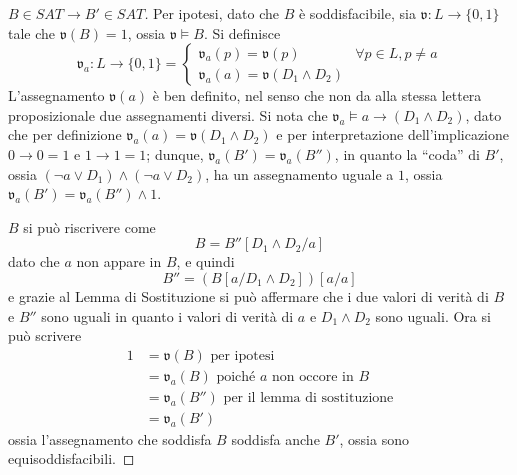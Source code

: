 \begin{proof}[$B \in SAT \rightarrow B' \in SAT$]
        Per ipotesi, dato che $B$ è soddisfacibile, sia $\mathfrak{v}:L \rightarrow \{0,1\}$
        tale che $\mathfrak{v}(B) = 1$, ossia $\mathfrak{v} \models B$. 
        Si definisce 
        $$
        \mathfrak{v}_a: L \rightarrow \{0,1\} = 
        \begin{cases}
                \mathfrak{v}_a(p) = \mathfrak{v}(p) & \forall p \in L, p \neq a \\
                \mathfrak{v}_a(a) = \mathfrak{v}(D_1 \land D_2) 
        \end{cases} 
        $$
        L'assegnamento $\mathfrak{v}(a)$ è ben definito, nel senso che non 
        da alla stessa lettera proposizionale due assegnamenti diversi.
        Si nota che $\mathfrak{v}_a \models a \rightarrow (D_1 \land D_2)$, 
        dato che per definizione $\mathfrak{v}_a(a) = \mathfrak{v}(D_1 \land D_2)$
        e per interpretazione dell'implicazione $0 \rightarrow 0 = 1$ e 
        $1 \rightarrow 1 = 1$; dunque, $\mathfrak{v}_a(B') = \mathfrak{v}_a(B'')$, 
        in quanto la ``coda'' di $B'$, ossia $(\neg a \lor D_1) \land (\neg a \lor D_2)$, 
        ha un assegnamento uguale a $1$, ossia 
        $\mathfrak{v}_a(B') = \mathfrak{v}_a(B'') \land 1$.

        $B$ si può riscrivere come 
        $$
        B = B''[D_1 \land D_2/a]
        $$
        dato che $a$ non appare in $B$, e quindi 
        $$
        B'' = (B[a/D_1 \land D_2])[a/a]
        $$
        e grazie al Lemma di Sostituzione si può affermare che i due valori 
        di verità di $B$ e $B''$ sono uguali in quanto i valori di verità di $a$ 
        e $D_1 \land D_2$ sono uguali. Ora si può scrivere 
        \begin{align*}
                1 &= \mathfrak{v}(B) \text{ per ipotesi } \\
                  &= \mathfrak{v}_a(B) \text { poiché } a \text{ non occore in } B \\
                  &= \mathfrak{v}_a(B'') \text{ per il lemma di sostituzione}  \\
                  &= \mathfrak{v}_a(B') 
        \end{align*}
        ossia l'assegnamento che soddisfa $B$ soddisfa anche $B'$, ossia 
        sono equisoddisfacibili. 
\end{proof}
